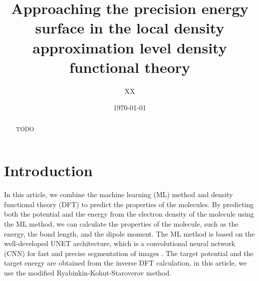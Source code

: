 \documentclass[%
twocolumn,
amsmath,amssymb,
groupedaddress,
reprint,%
]{revtex4-2}
\renewcommand{\>}{\rangle}
\newcommand{\<}{\langle}
\begin{document}
\title{Approaching the precision energy surface in the local density approximation level density functional theory}
\author{XX}

\date{\today}

\begin{abstract}
    {
        TODO
    }
\end{abstract}

\maketitle

\section{Introduction}
In this article, we combine the machine learning (ML) method and density functional theory (DFT) to predict the properties of the molecules.
% 
By predicting both the potential and the energy from the electron density of the molecule using the ML method, we can calculate the properties of the molecule, such as the energy, the bond length, and the dipole moment.
% 
The ML method is based on the well-developed UNET architecture, which is a convolutional neural network (CNN) for fast and precise segmentation of images \cite{Ronneberger2015}.
% 
The target potential and the target energy are obtained from the inverse DFT calculation, in this article, we use the modified Ryabinkin-Kohut-Staroverov method.
\end{document}

